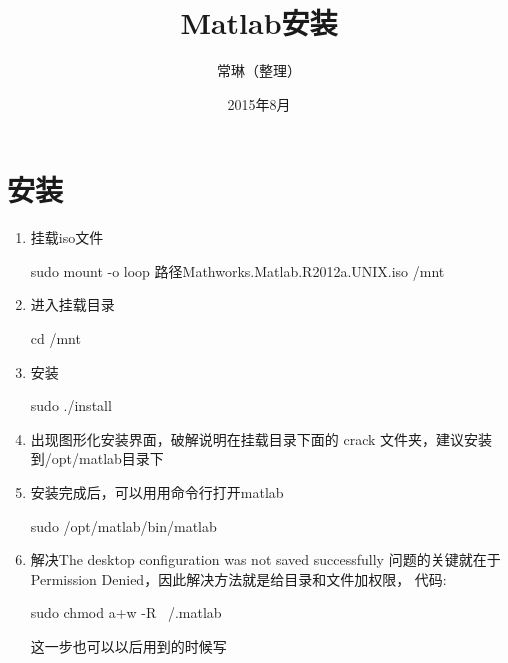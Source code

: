 \documentclass[12pt]{article}
\begin{document}
\title{\vspace{-2em}Matlab安装\vspace{-0.7em}}
\author{常琳（整理）}
\date{\vspace{-0.7em}2015年8月\vspace{-0.7em}}
\maketitle\thispagestyle{fancy}
\maketitle
\tableofcontents 

\section{安装}

\begin{enumerate}

\item 挂载iso文件

sudo  mount  -o  loop  路径Mathworks.Matlab.R2012a.UNIX.iso  /mnt  

\item 进入挂载目录

cd  /mnt

\item 安装

sudo  ./install

\item 出现图形化安装界面，破解说明在挂载目录下面的  crack  文件夹，建议安装到/opt/matlab目录下

\item 安装完成后，可以用用命令行打开matlab

sudo  /opt/matlab/bin/matlab

\item 解决The  desktop  configuration  was  not  saved  successfully
问题的关键就在于Permission  Denied，因此解决方法就是给目录和文件加权限，
代码:

sudo  chmod  a+w  -R  ~/.matlab

这一步也可以以后用到的时候写

\end{enumerate}
\end{document}
